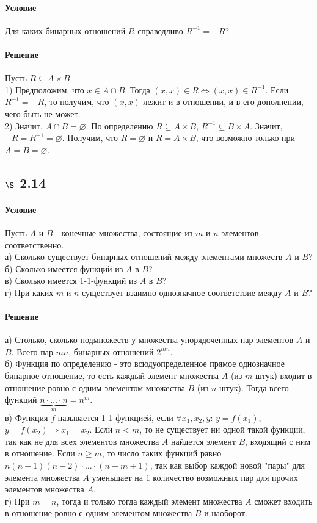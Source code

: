 \documentclass[a4paper,12pt]{article}
\begin{document}
\paragraph*{Условие}
Для каких бинарных отношений $R$ справедливо $R^{-1} = -R$?
\paragraph*{Решение}
Пусть $R \subseteq A\times B$. \\
1) Предположим, что $x\in A \cap B$. Тогда $(x,x) \in R \Leftrightarrow (x,x) \in R^{-1}$. Если $R^{-1} = -R$, то получим, что $(x,x)$ лежит и в отношении, и в его дополнении, чего быть не может.\\
2) Значит, $A \cap B=\varnothing$. По определению $R \subseteq A\times B$, $R^{-1} \subseteq B\times A$. Значит, $-R=R^{-1}=\varnothing$. Получим, что $R=\varnothing$ и $R=A\times B$, что возможно только при $A=B=\varnothing$.

\subsection*{$\S$ 2.14}
\paragraph*{Условие}
Пусть $A$ и $B$ - конечные множества, состоящие из $m$ и $n$ элементов соответственно.\\
а) Сколько существует бинарных отношений между элементами множеств $A$ и $B$?\\
б) Сколько имеется функций из $A$ в $B$?\\
в) Сколько имеется 1-1-функций из $A$ в $B$?\\
г) При каких $m$ и $n$ существует взаимно однозначное соответствие между $A$ и $B$?
\paragraph*{Решение}
а) Столько, сколько подмножеств у множества упорядоченных пар элементов $A$ и $B$. Всего пар $mn$,  бинарных отношений $2^{mn}$. \\
б) Функция по определению - это всюдуопределенное прямое однозначное бинарное отношение, то есть каждый элемент множества $A$ (из $m$ штук) входит в отношение ровно с одним элементом множества $B$ (из $n$ штук). Тогда всего функций $\underbrace{n\cdot \ldots \cdot n}_m = n^m$. \\
в) Функция $f$ называется 1-1-функцией, если $\forall x_1,x_2,y$: $y=f(x_1)$, $y=f(x_2)\Rightarrow x_1=x_2$. Если $n<m$, то не существует ни одной такой функции, так как не для всех элементов множества $A$ найдется элемент $B$, входящий с ним в отношение. Если $n\geqslant m$, то число таких функций равно $n(n-1)(n-2)\cdot \ldots \cdot (n-m+1)$, так как выбор каждой новой "пары" для элемента множества $A$ уменьшает на $1$ количество возможных пар для прочих элементов множества $A$.\\
г) При $m=n$, тогда и только тогда каждый элемент множества $A$ сможет входить в отношение ровно с одним элементом множества $B$ и наоборот.
\end{document}
